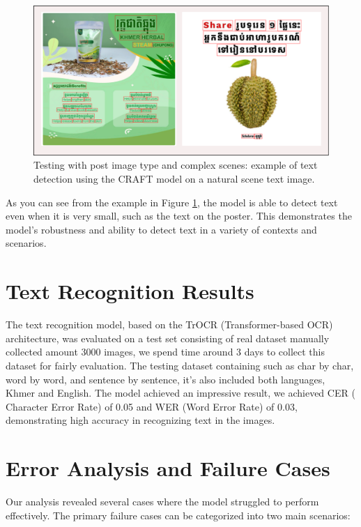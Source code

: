 \begin{figure}[ht]
    \centering
    \includegraphics[width=1\textwidth]{figures/image_detection_craft_02.png}
    \caption{Testing with post image type and complex scenes: example of text detection using the CRAFT 
    model on a natural scene text image.}
    \label{fig:detection-craft-post}
\end{figure}

As you can see from the example in Figure \ref{fig:detection-craft-post}, 
the model is able to detect text even when it is very small, such as the text on the poster. 
This demonstrates the model's robustness and ability to detect text in a variety of contexts and scenarios.
\section{Text Recognition Results}
\label{sec:recognition-results}
The text recognition model, based on the TrOCR (Transformer-based OCR) architecture, was
evaluated on a test set consisting of real dataset manually collected amount 3000 images, we
spend time around 3 days to collect this dataset for fairly evaluation. The testing dataset
containing such as char by char, word by word, and sentence by sentence, it's also included
both languages, Khmer and English. The model achieved an impressive result, we achieved CER
( Character Error Rate) of 0.05 and WER (Word Error Rate) of 0.03, demonstrating high accuracy
in recognizing text in the images.
\section{Error Analysis and Failure Cases}
\label{sec:error-analysis}
Our analysis revealed several cases where the model struggled to perform effectively. The primary failure cases can be categorized into two main scenarios:

